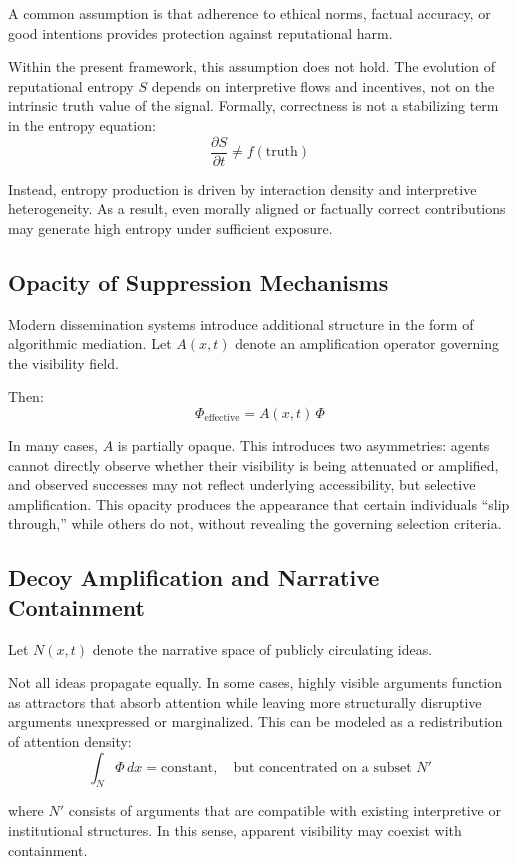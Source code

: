 \documentclass[12pt,a4paper]{article}
\begin{document}
A common assumption is that adherence to ethical norms, factual accuracy, or good intentions provides protection against reputational harm.

Within the present framework, this assumption does not hold. The evolution of reputational entropy $S$ depends on interpretive flows and incentives, not on the intrinsic truth value of the signal. Formally, correctness is not a stabilizing term in the entropy equation:
\[
\frac{\partial S}{\partial t}
\neq f(\text{truth})
\]

Instead, entropy production is driven by interaction density and interpretive heterogeneity. As a result, even morally aligned or factually correct contributions may generate high entropy under sufficient exposure.

\subsection{Opacity of Suppression Mechanisms}

Modern dissemination systems introduce additional structure in the form of algorithmic mediation. Let $A(x,t)$ denote an amplification operator governing the visibility field.

Then:
\[
\Phi_{\text{effective}} = A(x,t)\,\Phi
\]

In many cases, $A$ is partially opaque. This introduces two asymmetries: agents cannot directly observe whether their visibility is being attenuated or amplified, and observed successes may not reflect underlying accessibility, but selective amplification. This opacity produces the appearance that certain individuals ``slip through,'' while others do not, without revealing the governing selection criteria.

\subsection{Decoy Amplification and Narrative Containment}

Let $N(x,t)$ denote the narrative space of publicly circulating ideas.

Not all ideas propagate equally. In some cases, highly visible arguments function as attractors that absorb attention while leaving more structurally disruptive arguments unexpressed or marginalized. This can be modeled as a redistribution of attention density:
\[
\int_{N} \Phi \, dx = \text{constant}, \quad \text{but concentrated on a subset } N'
\]

where $N'$ consists of arguments that are compatible with existing interpretive or institutional structures. In this sense, apparent visibility may coexist with containment.
\end{document}
